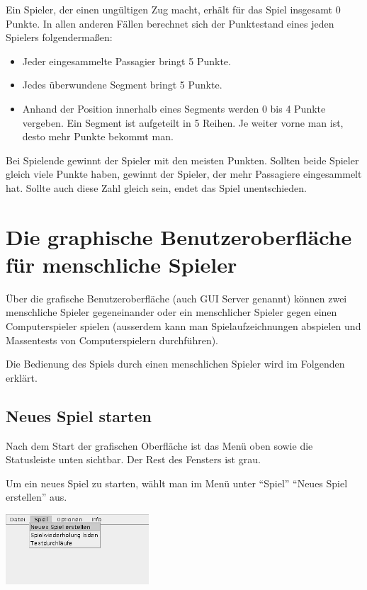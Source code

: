 \documentclass[12pt,a4paper, ngerman, oneside]{scrartcl}
\begin{document}
Ein Spieler, der einen ungültigen Zug macht, erhält für das Spiel insgesamt 0
Punkte. In allen anderen Fällen berechnet sich der Punktestand eines jeden
Spielers folgendermaßen:

\begin{itemize}
  \item Jeder eingesammelte Passagier bringt 5 Punkte.
  \item Jedes überwundene Segment bringt 5 Punkte.
  \item Anhand der Position innerhalb eines Segments werden 0 bis 4 Punkte
    vergeben. Ein Segment ist aufgeteilt in 5 Reihen. Je weiter vorne man ist,
    desto mehr Punkte bekommt man.
\end{itemize}

Bei Spielende gewinnt der Spieler mit den meisten Punkten. Sollten beide Spieler
gleich viele Punkte haben, gewinnt der Spieler, der mehr Passagiere eingesammelt
hat. Sollte auch diese Zahl gleich sein, endet das Spiel unentschieden.

\section{Die graphische Benutzeroberfläche für menschliche Spieler}

Über die grafische Benutzeroberfläche (auch GUI Server genannt) können zwei
menschliche Spieler gegeneinander oder ein menschlicher Spieler gegen einen
Computerspieler spielen (ausserdem kann man Spielaufzeichnungen abspielen und
Massentests von Computerspielern durchführen).

Die Bedienung des Spiels durch einen menschlichen Spieler wird im Folgenden
erklärt.

\subsection{Neues Spiel starten}

Nach dem Start der grafischen Oberfläche ist das Menü oben sowie die Statusleiste unten sichtbar. Der Rest des Fensters ist grau.

Um ein neues Spiel zu starten, wählt man im Menü unter ``Spiel'' ``Neues Spiel
erstellen'' aus.

{%
\centering%
\includegraphics[width=0.4\textwidth]{bilder/neues-spiel-menu.jpg}
}
\end{document}

